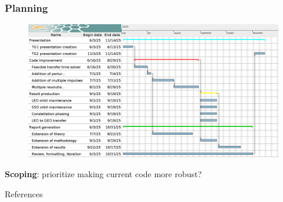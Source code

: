 \documentclass{beamer}
\begin{document}
\begin{frame}
    \frametitle{Planning}

    \begin{figure}[htbp]
        \centering
        \includegraphics[width=\textwidth]{img/TG planning.png}
    \end{figure}
    \pause
    \textbf{Scoping}: prioritize making current code more robust?

\end{frame}

\begin{frame}[allowframebreaks]{References}
    
    
\end{frame}
\end{document}
